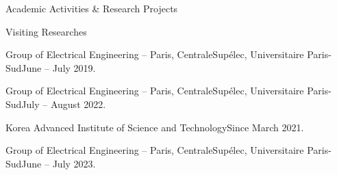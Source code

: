 \documentclass{resume} %
\begin{document}
\begin{rSection}{Academic Activities \& Research Projects}
\begin{rSubsection}{Visiting Researches}{}{}{}
\item Group of Electrical Engineering -- Paris, CentraleSup{\'e}lec, Universitaire Paris-Sud\hfill June -- July 2019.
\item Group of Electrical Engineering -- Paris, CentraleSup{\'e}lec, Universitaire Paris-Sud\hfill July -- August 2022.
\item Korea Advanced Institute of Science and Technology\hfill Since March 2021.
\item Group of Electrical Engineering -- Paris, CentraleSup{\'e}lec, Universitaire Paris-Sud\hfill June -- July 2023.
\end{rSubsection}




\end{rSection}
\end{document}
